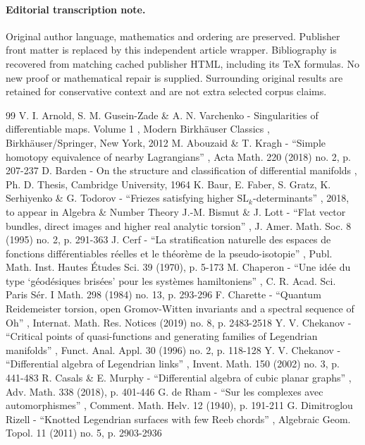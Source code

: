 \documentclass[11pt]{article}
\numberwithin{equation}{section}\providecommand{\dpl}{\displaystyle}
\begin{document}
\paragraph{Editorial transcription note.}
Original author language, mathematics and ordering are preserved. Publisher front matter is replaced by this independent article wrapper. Bibliography is recovered from matching cached publisher HTML, including its TeX formulas. No new proof or mathematical repair is supplied. Surrounding original results are retained for conservative context and are not extra selected corpus claims.
\clearpage

\begin{thebibliography}{99}
 V. I. Arnold, S. M. Gusein-Zade \& A. N. Varchenko - Singularities of differentiable maps. Volume 1 , Modern Birkhäuser Classics , Birkhäuser/Springer, New York, 2012
 M. Abouzaid \& T. Kragh - “Simple homotopy equivalence of nearby Lagrangians” , Acta Math. 220 (2018) no. 2, p. 207-237
 D. Barden - On the structure and classification of differential manifolds , Ph. D. Thesis, Cambridge University, 1964
 K. Baur, E. Faber, S. Gratz, K. Serhiyenko \& G. Todorov - “Friezes satisfying higher $\mathrm{SL}_k$-determinants” , 2018, to appear in Algebra \& Number Theory
 J.-M. Bismut \& J. Lott - “Flat vector bundles, direct images and higher real analytic torsion” , J. Amer. Math. Soc. 8 (1995) no. 2, p. 291-363
 J. Cerf - “La stratification naturelle des espaces de fonctions différentiables réelles et le théorème de la pseudo-isotopie” , Publ. Math. Inst. Hautes Études Sci. 39 (1970), p. 5-173
 M. Chaperon - “Une idée du type ‘géodésiques brisées’ pour les systèmes hamiltoniens” , C. R. Acad. Sci. Paris Sér. I Math. 298 (1984) no. 13, p. 293-296
 F. Charette - “Quantum Reidemeister torsion, open Gromov-Witten invariants and a spectral sequence of Oh” , Internat. Math. Res. Notices (2019) no. 8, p. 2483-2518
 Y. V. Chekanov - “Critical points of quasi-functions and generating families of Legendrian manifolds” , Funct. Anal. Appl. 30 (1996) no. 2, p. 118-128
 Y. V. Chekanov - “Differential algebra of Legendrian links” , Invent. Math. 150 (2002) no. 3, p. 441-483
 R. Casals \& E. Murphy - “Differential algebra of cubic planar graphs” , Adv. Math. 338 (2018), p. 401-446
 G. de Rham - “Sur les complexes avec automorphismes” , Comment. Math. Helv. 12 (1940), p. 191-211
 G. Dimitroglou Rizell - “Knotted Legendrian surfaces with few Reeb chords” , Algebraic Geom. Topol. 11 (2011) no. 5, p. 2903-2936

\end{thebibliography}
\end{document}
